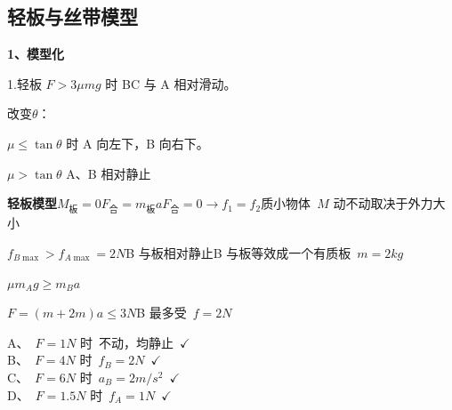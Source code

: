 \subsection{轻板与丝带模型}
\textbf{1、模型化}

1.轻板
$F>3\mu mg$ 时 BC 与 A 相对滑动。

改变$\theta$：

$\mu\le\tan\theta$ 时 A 向左下，B 向右下。 %

$\mu>\tan\theta$ A、B 相对静止 %

\textbf{轻板模型}\quad $M_{\text{板}}=0$\quad $F_{\text{合}}=m_{\text{板}}a$\quad $F_{\text{合}}=0\to f_1=f_2$\quad 质小物体\ $M$ 动不动取决于外力大小%

\begin{problem}
\begin{solution}
$f_{B\max}>f_{A\max}=2\unit{N}$\quad B 与板相对静止\quad B 与板等效成一个有质板\ $m=2\unit{kg}$

$\mu m_Ag\ge m_Ba$

$F=(m+2m)a\le3\unit{N}$\quad B 最多受\ $f=2\unit{N}$

\noindent A、\ $F=1\unit{N}$ 时\ 不动，均静止\ $\checkmark$\\
B、\ $F=4\unit{N}$ 时\ $f_B=2\unit{N}$\ $\checkmark$\\
C、\ $F=6\unit{N}$ 时\ $a_B=2\unit{m/s^2}$\ $\checkmark$\\
D、\ $F=1.5\unit{N}$ 时\ $f_A=1\unit{N}$\ $\checkmark$
\end{solution}
\end{problem}

